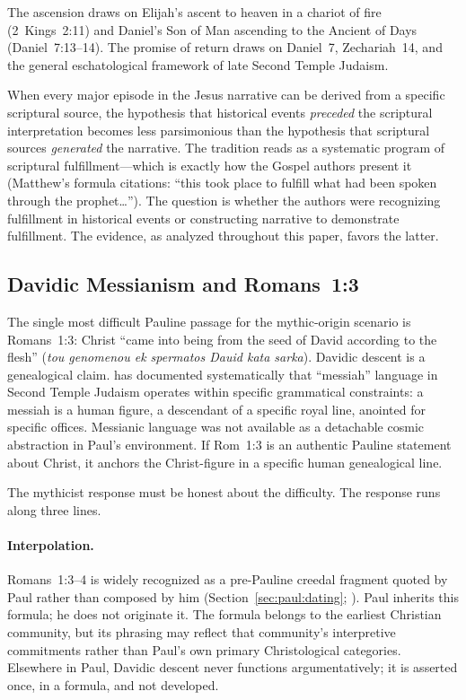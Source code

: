 \documentclass[12pt,oneside]{article}
\newcommand{\grk}[1]{\textit{#1}}   %
\begin{document}
The ascension draws on Elijah's ascent to heaven in a chariot of fire
(2~Kings~2:11) and Daniel's Son of Man ascending to the Ancient of Days
(Daniel~7:13--14).  The promise of return draws on Daniel~7, Zechariah~14,
and the general eschatological framework of late Second Temple Judaism.

When every major episode in the Jesus narrative can be derived from a
specific scriptural source, the hypothesis that historical events
\textit{preceded} the scriptural interpretation becomes less
parsimonious than the hypothesis that scriptural sources \textit{generated}
the narrative.  The tradition reads as a systematic program of
scriptural fulfillment---which is exactly how the Gospel authors
present it (Matthew's formula citations: ``this took place to fulfill
what had been spoken through the prophet\ldots'').  The question is
whether the authors were recognizing fulfillment in historical events or
constructing narrative to demonstrate fulfillment.  The evidence, as
analyzed throughout this paper, favors the latter.

\subsection{Davidic Messianism and Romans~1:3}
\label{sec:myth:davidic}

The single most difficult Pauline passage for the mythic-origin
scenario is Romans~1:3: Christ \enquote{came into being from the seed
of David according to the flesh} (\grk{tou genomenou ek spermatos
Dauid kata sarka}).  Davidic descent is a genealogical claim.
\citet{Novenson2012,Novenson2017} has documented systematically that
\enquote{messiah} language in Second Temple Judaism operates within
specific grammatical constraints: a messiah is a human figure, a
descendant of a specific royal line, anointed for specific offices.
Messianic language was not available as a detachable cosmic abstraction
in Paul's environment.  If Rom~1:3 is an authentic Pauline statement
about Christ, it anchors the Christ-figure in a specific human
genealogical line.

The mythicist response must be honest about the difficulty.  The
response runs along three lines.

\paragraph{Interpolation.}
Romans~1:3--4 is widely recognized as a pre-Pauline creedal fragment
quoted by Paul rather than composed by him (Section~\ref{sec:paul:dating};
\citealt{Jewett2007}).  Paul inherits this formula; he does not
originate it.  The formula belongs to the earliest Christian community,
but its phrasing may reflect that community's interpretive
commitments rather than Paul's own primary Christological categories.
Elsewhere in Paul, Davidic descent never functions argumentatively;
it is asserted once, in a formula, and not developed.
\end{document}
